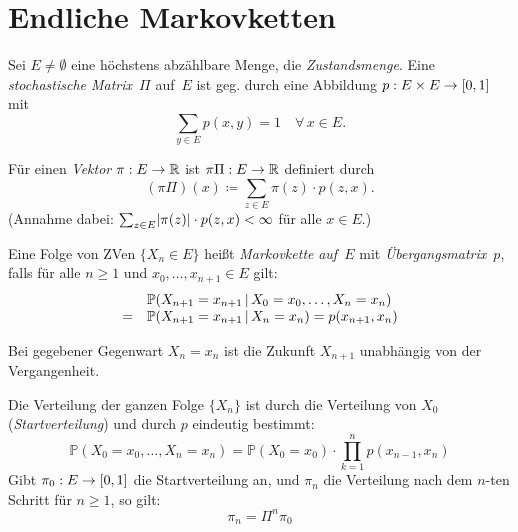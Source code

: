 \documentclass{cheat-sheet}
\renewcommand{\P}{\mathbb{P}} %
\begin{document}
\raggedcolumns %


\section{Endliche Markovketten}

\begin{setting}
  Sei $E \neq \emptyset$ eine höchstens abzählbare Menge, die \textit{Zustandsmenge}.
  Eine \emph{stochastische Matrix}~$\Pi$ auf~$E$ ist geg. durch eine Abbildung $p : E \times E \to \left[ 0, 1 \right]$ mit
  \[
    {\sum}_{y \in E} p(x, y) = 1 \quad
    \forall\,x \in E.
  \]
\end{setting}

\begin{defn}
  Für einen \textit{Vektor} $\pi : E \to \mathbb{R}$ ist $\pi \Pi : E \to \mathbb{R}$ definiert durch
  \[
    (\pi \Pi)(x) \coloneqq {\sum}_{z \in E} \pi(z) \cdot p(z, x).
  \]
  (Annahme dabei: ${\sum}_{z \in E} \abs{\pi(z)} \cdot p(z, x) < \infty$ für alle $x \in E$.)
\end{defn}

\begin{defn}
  Eine Folge von ZVen $\{ X_n \in E \}$ heißt \emph{Markovkette} \textit{auf~$E$} mit \textit{Übergangsmatrix}~$p$, falls für alle $n \geq 1$ und $x_0, \ldots, x_{n+1} \in E$ gilt:
  \[
    \begin{array}{r l}
      & \P(X_{n+1} = x_{n+1} \,|\, X_0=x_0, \ldots, X_n=x_n) \\
      = & \P(X_{n+1} = x_{n+1} \,|\, X_n=x_n)
      = p(x_{n+1}, x_n)
    \end{array}
  \]
\end{defn}

\begin{interp}
  Bei gegebener Gegenwart $X_n = x_n$ ist die Zukunft $X_{n+1}$ unabhängig von der Vergangenheit.
\end{interp}

\begin{bem}
  Die Verteilung der ganzen Folge $\{ X_n \}$ ist durch die Verteilung von $X_0$ (\textit{Startverteilung}) und durch $p$ eindeutig bestimmt:
  \[
    \P(X_0=x_0, \ldots, X_n=x_n) = \P(X_0=x_0) \cdot {\prod}_{k=1}^n p(x_{n-1}, x_n)
  \]
  Gibt $\pi_0 : E \to \left[ 0, 1 \right]$ die Startverteilung an, und $\pi_n$ die Verteilung nach dem $n$-ten Schritt für $n \geq 1$, so gilt:
  \[
    \pi_n = \Pi^n \pi_0
  \]
\end{bem}
\end{document}
